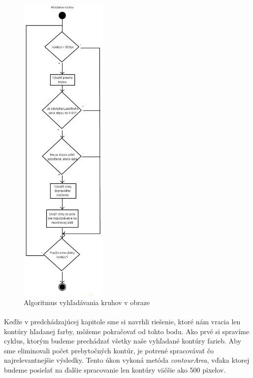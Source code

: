 \documentclass[12pt]{article}
\begin{document}
\begin{figure}[p]
\centering
\includegraphics[width=0.38\textwidth,natwidth=318,natheight=1164]{hladanie_kruhov.jpg}
\vspace{-20pt}
\caption{Algoritmus vyhľadávania kruhov v obraze}
\vspace{-10pt}
\label{hladanie_kruhov}
\end{figure}

\paragraph{}
Keďže v predchádzajúcej kapitole sme si navrhli riešenie, ktoré nám vracia len kontúry hľadanej farby, môžeme pokračovať od tohto bodu.
Ako prvé si spravíme cyklus, ktorým budeme prechádzať všetky naše vyhľadané kontúry farieb. Aby sme eliminovali počet prebytočných kontúr, 
je potrené spracovávať čo najrelevantnejšie výsledky. Tento úkon vykoná metóda \emph{contourArea}, vďaka ktorej budeme posielať na ďalšie spracovanie len kontúry väčšie ako 500 pixelov.
\end{document}
